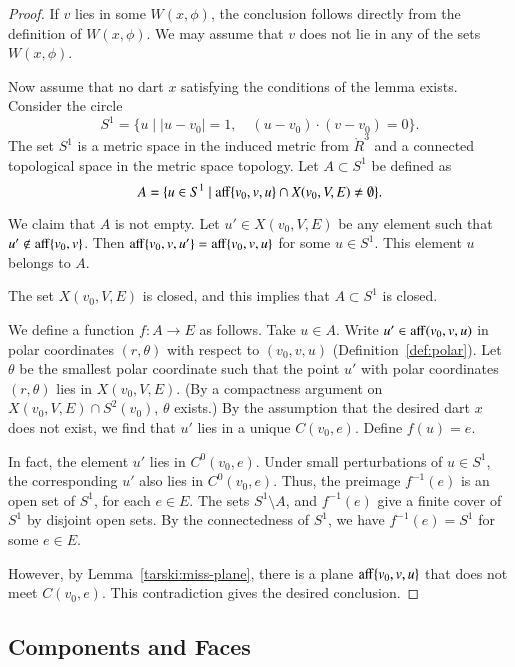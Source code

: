 \begin{proof} 
If $v$ lies in some $W(x,\phi)$, the conclusion follows
directly from the definition of $W(x,\phi)$.  We may
assume that $v$ does not lie in any of the sets $W(x,\phi)$.

Now assume that no  dart $x$ satisfying the conditions
of the lemma exists.  
Consider the circle
   $$S^1 = \{u\mid |u-v_0|=1,\quad
     (u-v_0)\cdot (v-v_0) = 0\}.$$
The set $S^1$ is a metric space in the induced metric
from $\ring{R}^3$ and a connected topological space in the
metric space topology.
Let $A\subset S^1$ be defined as
  $$
  A = \{u \in S^1 \mid  {\operatorname{aff}}\{v_0,v,u\} \cap X(v_0,V,E)\ne\emptyset\}.
  $$

We claim that $A$ is not empty.  Let $u'\in X(v_0,V,E)$ be any
element such that $u'\not\in {\operatorname{aff}}\{v_0,v\}$.  Then
${\operatorname{aff}}\{v_0,v,u'\} = {\operatorname{aff}}\{v_0,v,u\}$ for some $u\in S^1$.
This element $u$ belongs to $A$.

The set $X(v_0,V,E)$ is closed, and this implies that $A\subset S^1$
is closed.  

We define a function $f:A\to E$ as follows.  Take $u\in A$.
Write
$u'\in{\operatorname{aff}}(v_0,v,u)$ in polar coordinates
$(r,\theta)$ with respect to $(v_0,v,u)$ (Definition~\ref{def:polar}).
Let $\theta$ be the smallest polar coordinate such
that the point $u'$ with polar coordinates $(r,\theta)$ lies
in $X(v_0,V,E)$.  (By a compactness argument
on $X(v_0,V,E)\cap S^2(v_0)$, $\theta$ exists.)  By the
assumption that the desired dart $x$ does not exist, we
find that $u'$ lies in a unique $C(v_0,e)$.  Define $f(u)=e$.

In fact, the element $u'$  lies in $C^0(v_0,e)$.  Under small
perturbations of $u\in S^1$, the corresponding $u'$ also
lies in $C^0(v_0,e)$.  Thus, the preimage $f^{-1}(e)$ is an
open set of $S^1$, for each $e\in E$.  The sets $S^1\setminus A$,
and $f^{-1}(e)$ give a finite cover of $S^1$ by disjoint open
sets.  By the connectedness of $S^1$, we have $f^{-1}(e)=S^1$
for some $e\in E$.

However, by Lemma~\ref{tarski:miss-plane}, there is a 
plane ${\operatorname{aff}}\{v_0,v,u\}$ that does not meet $C(v_0,e)$.
This contradiction gives the desired conclusion.
\end{proof}


\subsection{Components and Faces}

